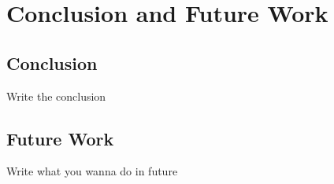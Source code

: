 \chapter{Conclusion and Future Work}



\section{Conclusion}
Write the conclusion 

\section{Future Work}
Write what you wanna do in future